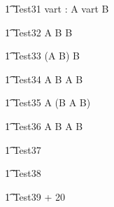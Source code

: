 \begin{circusaction}
   \t1 Test31 \circdef \circvres vart : \nat  \circspot  A \circtimedinterrupt \lcirctime vart \rcirctime B \\
\end{circusaction}


\begin{circusaction}
   \t1 Test32 \circdef  A \circseq B \circtimedinterrupt {} \rcirctime B  \\
\end{circusaction}

\begin{circusaction}
   \t1 Test33 \circdef  (A \circseq B) \circtimedinterrupt {} \rcirctime B \\
\end{circusaction}

\begin{circusaction}
   \t1 Test34 \circdef  A \circseq B \circtimedinterrupt {} \rcirctime  A \circseq B \\
\end{circusaction}

\begin{circusaction}
   \t1 Test35 \circdef  A \circseq (B \circtimedinterrupt {} \rcirctime A \circseq B)\\
\end{circusaction}

\begin{circusaction}
   \t1 Test36 \circdef  A \circtimedinterrupt {} \rcirctime B \circtimedinterrupt {} \rcirctime A \circseq B\\
\end{circusaction}


\begin{circusaction}
   \t1 Test37 \circdef  {} \\
\end{circusaction}


\begin{circusaction}
   \t1 Test38 \circdef   {}  \\
\end{circusaction}

\begin{circusaction}
   \t1 Test39 \circdef   {} + 20  \\
\end{circusaction}

